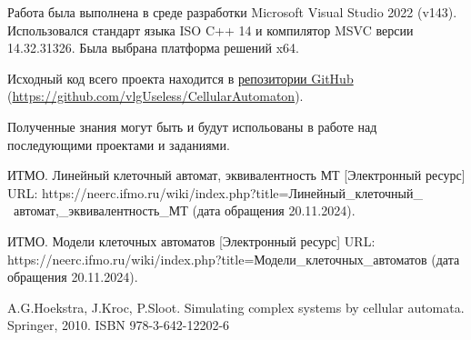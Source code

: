 \documentclass[a4paper, final]{article}
\begin{document}
Работа была выполнена в среде разработки Microsoft Visual Studio 2022 (v143). Использовался стандарт языка ISO C++ 14 и
компилятор MSVC версии 14.32.31326. Была выбрана платформа решений x64.

Исходный код всего проекта находится в \href{https://github.com/vlgUseless/CellularAutomaton}
{репозитории GitHub} (\url{https://github.com/vlgUseless/CellularAutomaton}).

Полученные знания могут быть и будут испольованы в работе над последующими проектами и заданиями.
\cleardoublepage
{}
\newpage
\begin{thebibliography}{0}
	ИТМО. Линейный клеточный автомат, эквивалентность МТ [Электронный ресурс] URL: 
  https://neerc.ifmo.ru/wiki/index.php?title=Линейный\_клеточный\_ \ автомат,\_эквивалентность\_МТ
  (дата обращения 20.11.2024).

	ИТМО. Модели клеточных автоматов [Электронный ресурс] URL: 
  https://neerc.ifmo.ru/wiki/index.php?title=Модели\_клеточных\_автоматов 
  (дата обращения 20.11.2024).

	A.G.Hoekstra, J.Kroc, P.Sloot. Simulating complex systems by cellular automata. Springer, 
  2010. ISBN 978-3-642-12202-6
\end{thebibliography}
\end{document}

